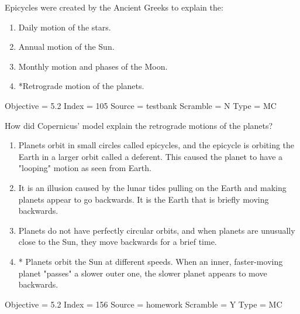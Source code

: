 \documentclass[11pt]{article}
\begin{document}
\begin{enumerate}
\begin{minipage}{\textwidth}
\begin{minipage}{\textwidth}
\item Epicycles were created by the Ancient Greeks to explain the:
\begin{multicols}{2}
\begin{enumerate} 
\setlength{\itemsep}{1pt} 
\setlength{\parskip}{0pt} 
\setlength{\parsep}{0pt}
\setlength{\multicolsep}{1pt} 
\item Daily motion of the stars.
\item Annual motion of the Sun.
\item Monthly motion and phases of the Moon.
\item *Retrograde motion of the planets.
\end{enumerate} 
\vfill 
\end{multicols}

Objective = 5.2
Index = 105
Source = testbank
Scramble = N
Type = MC
\end{minipage}
\end{minipage}
\vskip 0.20in

\begin{minipage}{\textwidth}
\begin{minipage}{\textwidth}
\item How did Copernicus' model explain the retrograde motions of the planets?
\begin{enumerate} 
\setlength{\itemsep}{1pt} 
\setlength{\parskip}{0pt} 
\setlength{\parsep}{0pt}
\setlength{\multicolsep}{1pt} 
\item  Planets orbit in small circles called epicycles, and the epicycle is orbiting the Earth in a larger orbit called a deferent. This caused the planet to have a "looping" motion as seen from Earth.
\item  It is an illusion caused by the lunar tides pulling on the Earth and making planets appear to go backwards. It is the Earth that is briefly moving backwards.
\item  Planets do not have perfectly circular orbits, and when planets are unusually close to the Sun, they move backwards for a brief time.
\item * Planets orbit the Sun at different speeds. When an inner, faster-moving planet "passes" a slower outer one, the slower planet appears to move backwards.
\end{enumerate} 
Objective = 5.2
Index = 156
Source = homework
Scramble = Y
Type = MC
\end{minipage}
\end{minipage}
\vskip 0.20in


\end{enumerate}
\end{document}
